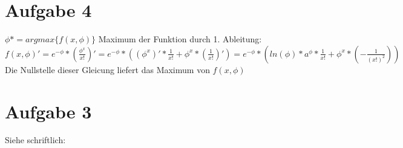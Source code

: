 \documentclass[a4paper,10pt,oneside,leqno]{scrartcl}
\begin{document}
\section*{Aufgabe 4}%
$\phi* = argmax\{f(x,\phi)\}$\newline
Maximum der Funktion durch 1. Ableitung:\newline
$f(x,\phi)'= e^{-\phi}*(\frac{\phi^x}{x!})' = e^{-\phi}*((\phi^x)'*\frac{1}{x!} + \phi^x *(\frac{1}{x!})')
= e^{-\phi}*(ln(\phi)*a^{\phi}*\frac{1}{x!} + \phi^x * (-\frac{1}{(x!)^2}))$\newline
Die Nullstelle dieser Gleicung liefert das Maximum von $f(x,\phi)$

\section*{Aufgabe 3}%

Siehe schriftlich:


\end{document}
